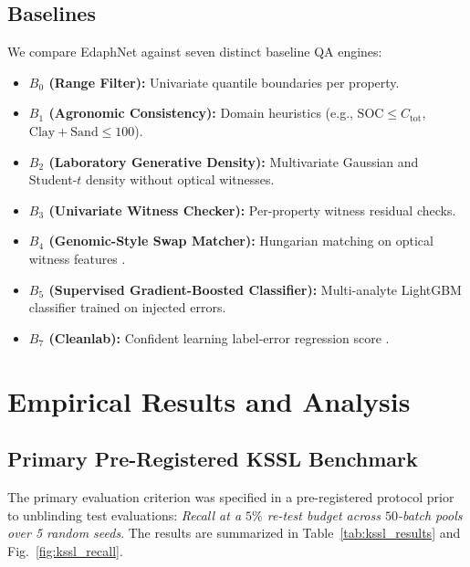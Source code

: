 \documentclass[journal,twoside]{IEEEtran}
\begin{document}
\subsection{Baselines}
We compare EdaphNet against seven distinct baseline QA engines:
\begin{itemize}
    \item \textbf{$B_0$ (Range Filter):} Univariate quantile boundaries per property.
    \item \textbf{$B_1$ (Agronomic Consistency):} Domain heuristics (e.g., $\text{SOC} \le C_{\text{tot}}$, $\text{Clay} + \text{Sand} \le 100$).
    \item \textbf{$B_2$ (Laboratory Generative Density):} Multivariate Gaussian and Student-$t$ density without optical witnesses.
    \item \textbf{$B_3$ (Univariate Witness Checker):} Per-property witness residual checks.
    \item \textbf{$B_4$ (Genomic-Style Swap Matcher):} Hungarian matching on optical witness features \cite{broman2015sample}.
    \item \textbf{$B_5$ (Supervised Gradient-Boosted Classifier):} Multi-analyte LightGBM classifier trained on injected errors.
    \item \textbf{$B_7$ (Cleanlab):} Confident learning label-error regression score \cite{zhou2024detecting}.
\end{itemize}

\section{Empirical Results and Analysis}

\subsection{Primary Pre-Registered KSSL Benchmark}
The primary evaluation criterion was specified in a pre-registered protocol prior to unblinding test evaluations: \emph{Recall at a $5\%$ re-test budget across $50$-batch pools over 5 random seeds}. The results are summarized in Table~\ref{tab:kssl_results} and Fig.~\ref{fig:kssl_recall}.
\end{document}
